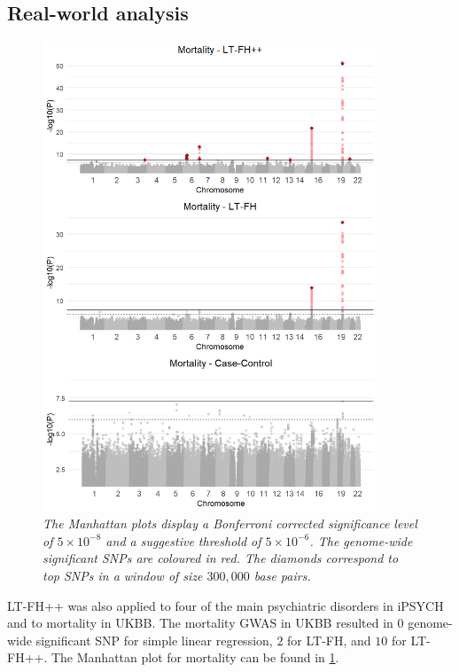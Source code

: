 \subsection{Real-world analysis}
\begin{figure}
	\includegraphics[width=10cm]{results/manhattanPlot_mortality.png}
	\caption[Manhattan plots for LT-FH++, LT-FH, and case-control GWAS of mortality	in the UK Biobank]{
		\sl The Manhattan plots display a Bonferroni corrected significance level of $ 5\times 10^{-8} $ and a suggestive threshold of $ 5\times 10^{-6} $. The genome-wide significant SNPs are coloured in red. The diamonds correspond to top	SNPs in a window of size $ 300,000 $ base pairs.}
	\label{fig:LTFH++_manhattanMortality}
\end{figure}

LT-FH++ was also applied to four of the main psychiatric disorders in iPSYCH and to mortality in UKBB. The mortality GWAS in UKBB resulted in $ 0 $ genome-wide significant SNP for simple linear regression, $ 2 $ for LT-FH, and $ 10 $ for LT-FH++. The Manhattan plot for mortality can be found in \cref{fig:LTFH++_manhattanMortality}.

